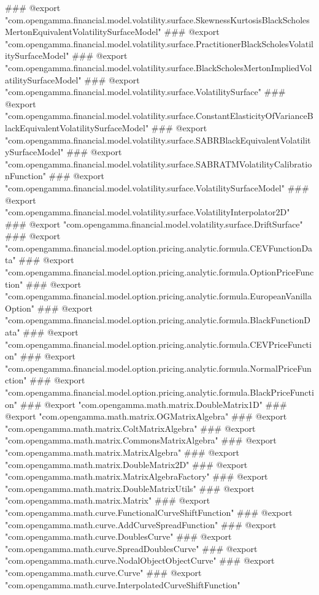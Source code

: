 ### @export "com.opengamma.financial.model.volatility.surface.SkewnessKurtosisBlackScholesMertonEquivalentVolatilitySurfaceModel"
### @export "com.opengamma.financial.model.volatility.surface.PractitionerBlackScholesVolatilitySurfaceModel"
### @export "com.opengamma.financial.model.volatility.surface.BlackScholesMertonImpliedVolatilitySurfaceModel"
### @export "com.opengamma.financial.model.volatility.surface.VolatilitySurface"
### @export "com.opengamma.financial.model.volatility.surface.ConstantElasticityOfVarianceBlackEquivalentVolatilitySurfaceModel"
### @export "com.opengamma.financial.model.volatility.surface.SABRBlackEquivalentVolatilitySurfaceModel"
### @export "com.opengamma.financial.model.volatility.surface.SABRATMVolatilityCalibrationFunction"
### @export "com.opengamma.financial.model.volatility.surface.VolatilitySurfaceModel"
### @export "com.opengamma.financial.model.volatility.surface.VolatilityInterpolator2D"
### @export "com.opengamma.financial.model.volatility.surface.DriftSurface"
### @export "com.opengamma.financial.model.option.pricing.analytic.formula.CEVFunctionData"
### @export "com.opengamma.financial.model.option.pricing.analytic.formula.OptionPriceFunction"
### @export "com.opengamma.financial.model.option.pricing.analytic.formula.EuropeanVanillaOption"
### @export "com.opengamma.financial.model.option.pricing.analytic.formula.BlackFunctionData"
### @export "com.opengamma.financial.model.option.pricing.analytic.formula.CEVPriceFunction"
### @export "com.opengamma.financial.model.option.pricing.analytic.formula.NormalPriceFunction"
### @export "com.opengamma.financial.model.option.pricing.analytic.formula.BlackPriceFunction"
### @export "com.opengamma.math.matrix.DoubleMatrix1D"
### @export "com.opengamma.math.matrix.OGMatrixAlgebra"
### @export "com.opengamma.math.matrix.ColtMatrixAlgebra"
### @export "com.opengamma.math.matrix.CommonsMatrixAlgebra"
### @export "com.opengamma.math.matrix.MatrixAlgebra"
### @export "com.opengamma.math.matrix.DoubleMatrix2D"
### @export "com.opengamma.math.matrix.MatrixAlgebraFactory"
### @export "com.opengamma.math.matrix.DoubleMatrixUtils"
### @export "com.opengamma.math.matrix.Matrix"
### @export "com.opengamma.math.curve.FunctionalCurveShiftFunction"
### @export "com.opengamma.math.curve.AddCurveSpreadFunction"
### @export "com.opengamma.math.curve.DoublesCurve"
### @export "com.opengamma.math.curve.SpreadDoublesCurve"
### @export "com.opengamma.math.curve.NodalObjectObjectCurve"
### @export "com.opengamma.math.curve.Curve"
### @export "com.opengamma.math.curve.InterpolatedCurveShiftFunction"
